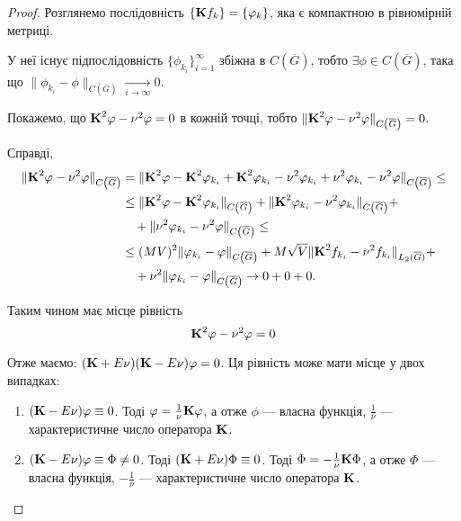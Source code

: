 \begin{proof}
    Розглянемо послідовність $\{ \bf{K}f_k \} = \{ \phi_k\}$, яка є компактною в рівномірній метриці. \medskip

    У неї існує підпослідовність $\{\phi_{k_i}\}_{i = 1}^\infty$ збіжна в $C\left(\overline G\right)$, тобто $\exists \phi \in C\left(\overline G\right)$, така що $\| \phi_{k_i} - \phi\|_{C\left(\overline G\right)} \xrightarrow[i \to \infty]{} 0$. \medskip

    Покажемо, що $\bf{K}^2 \phi - \nu^2 \phi = 0$ в кожній точці, тобто $\| \bf{K}^2\phi - \nu^2 \phi\|_{C\left(\overline G\right)} = 0$. \medskip

    Справді,
    \begin{equation}
        \begin{aligned}
            \|\bf{K}^2\phi - \nu^2\phi\|_{C\left(\overline G\right)} &= \|\bf{K}^2\phi - \bf{K}^2\phi_{k_i} + \bf{K}^2\phi_{k_i} - \nu^2\phi_{k_i} + \nu^2\phi_{k_i} - \nu^2\phi\|_{C\left(\overline G\right)} \le \\
            &\le \|\bf{K}^2\phi-\bf{K}^2\phi_{k_i}\|_{C\left(\overline G\right)} + \|\bf{K}^2\phi_{k_i}-\nu^2\phi_{k_i}\|_{C\left(\overline G\right)}+ \\
            &\quad + \|\nu^2\phi_{k_i}-\nu^2\phi\|_{C\left(\overline G\right)} \le \\
            &\le (MV)^2 \|\phi_{k_i} - \phi\|_{C\left(\overline G\right)} + M\sqrt{V} \|\bf{K}^2f_{k_i}-\nu^2f_{k_i}\|_{L_2(\overline G)} + \\
            &\quad + \nu^2 \|\phi_{k_i} - \phi\|_{C\left(\overline G\right)} \to 0 + 0 + 0.
        \end{aligned}
    \end{equation}
    
    Таким чином має місце рівність
    \begin{equation}
        \bf{K}^2 \phi - \nu^2 \phi = 0
    \end{equation}
    
    Отже маємо: $(\bf{K} + E\nu)(\bf{K} - E \nu)\phi=0$. Ця рівність може мати місце у двох випадках:
    \begin{enumerate}
        \item $(\bf{K} - E\nu) \phi \equiv 0$. Тоді $\phi = \frac{1}{\nu}\bf{K}\phi$, а отже $\phi$ --- власна функція, $\frac{1}{\nu}$ --- характеристичне число оператора $\bf{K}$.

        \item $(\bf{K} - E\nu) \phi \equiv \Phi \ne 0$. Тоді $(\bf{K} + E \nu) \Phi \equiv 0$. Тоді $\Phi = -\frac{1}{\nu}\bf{K}\Phi$, а отже $\Phi$ --- власна функція, $-\frac{1}{\nu}$ --- характеристичне число оператора $\bf{K}$.
    \end{enumerate}
    

\end{proof}
